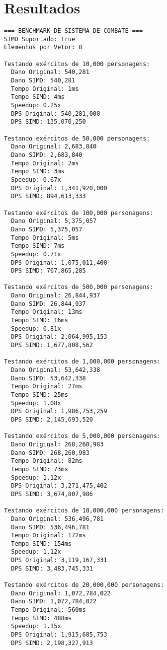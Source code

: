 \documentclass[
	12pt,				%
	oneside,			%
	a4paper,			%
	english,			%
	brazil,				%
	]{abntex2}
\begin{document}
{\section{Resultados}

\begin{verbatim}
=== BENCHMARK DE SISTEMA DE COMBATE ===
SIMD Suportado: True
Elementos por Vetor: 8

Testando exércitos de 10,000 personagens:
  Dano Original: 540,281
  Dano SIMD: 540,281
  Tempo Original: 1ms
  Tempo SIMD: 4ms
  Speedup: 0.25x
  DPS Original: 540,281,000
  DPS SIMD: 135,070,250

Testando exércitos de 50,000 personagens:
  Dano Original: 2,683,840
  Dano SIMD: 2,683,840
  Tempo Original: 2ms
  Tempo SIMD: 3ms
  Speedup: 0.67x
  DPS Original: 1,341,920,000
  DPS SIMD: 894,613,333

Testando exércitos de 100,000 personagens:
  Dano Original: 5,375,057
  Dano SIMD: 5,375,057
  Tempo Original: 5ms
  Tempo SIMD: 7ms
  Speedup: 0.71x
  DPS Original: 1,075,011,400
  DPS SIMD: 767,865,285

Testando exércitos de 500,000 personagens:
  Dano Original: 26,844,937
  Dano SIMD: 26,844,937
  Tempo Original: 13ms
  Tempo SIMD: 16ms
  Speedup: 0.81x
  DPS Original: 2,064,995,153
  DPS SIMD: 1,677,808,562

Testando exércitos de 1,000,000 personagens:
  Dano Original: 53,642,338
  Dano SIMD: 53,642,338
  Tempo Original: 27ms
  Tempo SIMD: 25ms
  Speedup: 1.08x
  DPS Original: 1,986,753,259
  DPS SIMD: 2,145,693,520

Testando exércitos de 5,000,000 personagens:
  Dano Original: 268,260,983
  Dano SIMD: 268,260,983
  Tempo Original: 82ms
  Tempo SIMD: 73ms
  Speedup: 1.12x
  DPS Original: 3,271,475,402
  DPS SIMD: 3,674,807,986

Testando exércitos de 10,000,000 personagens:
  Dano Original: 536,496,781
  Dano SIMD: 536,496,781
  Tempo Original: 172ms
  Tempo SIMD: 154ms
  Speedup: 1.12x
  DPS Original: 3,119,167,331
  DPS SIMD: 3,483,745,331

Testando exércitos de 20,000,000 personagens:
  Dano Original: 1,072,784,022
  Dano SIMD: 1,072,784,022
  Tempo Original: 560ms
  Tempo SIMD: 488ms
  Speedup: 1.15x
  DPS Original: 1,915,685,753
  DPS SIMD: 2,198,327,913
\end{verbatim}

}
\end{document}
